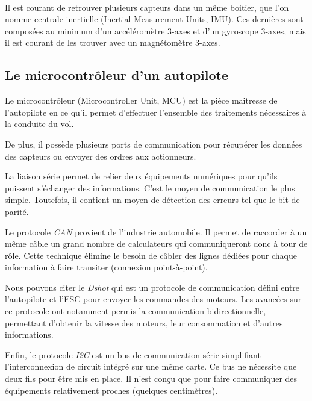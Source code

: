  \paragraph*{}
 Il est courant de retrouver plusieurs capteurs dans un même boitier, que l'on nomme centrale inertielle (Inertial Measurement Units, IMU). Ces dernières sont composées au minimum d'un accéléromètre 3-axes et d'un gyroscope 3-axes, mais il est courant de les trouver avec un magnétomètre 3-axes. 


 \subsection*{Le microcontrôleur d'un autopilote}
 Le microcontrôleur (Microcontroller Unit, MCU) est la pièce maitresse de l'autopilote en ce qu'il permet d'effectuer l'ensemble des traitements nécessaires à la conduite du vol.


 De plus, il possède plusieurs ports de communication pour récupérer les données des capteurs ou envoyer des ordres aux actionneurs.

La liaison série permet de relier deux équipements numériques pour qu'ils puissent s'échanger des informations. C'est le moyen de communication le plus simple. Toutefois, il contient un moyen de détection des erreurs tel que le bit de parité.

 Le protocole \textit{CAN} provient de l'industrie automobile. Il permet de raccorder à un même câble un grand nombre de calculateurs qui communiqueront donc à tour de rôle. Cette technique élimine le besoin de câbler des lignes dédiées pour chaque information à faire transiter (connexion point-à-point).

 Nous pouvons citer le \textit{Dshot} qui est un protocole de communication défini entre l'autopilote et l'ESC pour envoyer les commandes des moteurs. Les avancées sur ce protocole ont notamment permis la communication bidirectionnelle, permettant d'obtenir la vitesse des moteurs, leur consommation et d'autres informations.

 Enfin, le protocole \textit{I2C} est un bus de communication série simplifiant l'interconnexion de circuit intégré sur une même carte. Ce bus ne nécessite que deux fils pour être mis en place. Il n'est conçu que pour faire communiquer des équipements relativement proches (quelques centimètres).

